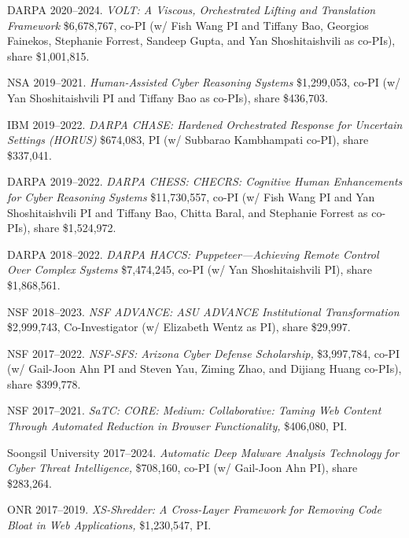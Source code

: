 \documentclass[11pt,letterpaper,sans]{moderncv}
\begin{document}
\begin{etaremune}

  \item DARPA 2020--2024. \textit{VOLT: A Viscous, Orchestrated Lifting and Translation Framework} \$6,678,767, co-PI (w/ Fish Wang PI and Tiffany Bao, Georgios Fainekos, Stephanie Forrest, Sandeep Gupta, and Yan Shoshitaishvili as co-PIs), share \$1,001,815.

  \item NSA 2019--2021. \textit{Human-Assisted Cyber Reasoning Systems} \$1,299,053, co-PI (w/ Yan Shoshitaishvili PI and Tiffany Bao as co-PIs), share \$436,703.

  \item IBM 2019--2022. \textit{DARPA CHASE: Hardened Orchestrated Response for Uncertain Settings (HORUS)} \$674,083, PI (w/ Subbarao Kambhampati co-PI), share \$337,041.

  \item DARPA 2019--2022. \textit{DARPA CHESS: CHECRS: Cognitive Human Enhancements for Cyber Reasoning Systems} \$11,730,557, co-PI (w/ Fish Wang PI and Yan Shoshitaishvili PI and Tiffany Bao, Chitta Baral, and Stephanie Forrest as co-PIs), share \$1,524,972.

  \item DARPA 2018--2022. \textit{DARPA HACCS: Puppeteer---Achieving Remote Control Over Complex Systems} \$7,474,245, co-PI (w/ Yan Shoshitaishvili PI), share \$1,868,561.

  \item NSF 2018--2023. \textit{NSF ADVANCE: ASU ADVANCE Institutional Transformation} \$2,999,743, Co-Investigator (w/ Elizabeth Wentz as PI), share \$29,997.
  
  \item NSF 2017--2022. \textit{NSF-SFS: Arizona Cyber Defense
    Scholarship,} \$3,997,784, co-PI (w/ Gail-Joon Ahn PI and Steven
    Yau, Ziming Zhao, and Dijiang Huang co-PIs), share \$399,778.

  \item NSF 2017--2021. \textit{SaTC: CORE: Medium: Collaborative:
    Taming Web Content Through Automated Reduction in Browser
    Functionality,} \$406,080, PI.

  \item Soongsil University 2017--2024. \textit{Automatic Deep Malware
    Analysis Technology for Cyber Threat Intelligence,} \$708,160,
    co-PI (w/ Gail-Joon Ahn PI), share \$283,264.

  \item ONR 2017--2019. \textit{XS-Shredder: A Cross-Layer Framework
    for Removing Code Bloat in Web Applications,} \$1,230,547, PI.


\end{etaremune}
\end{document}

